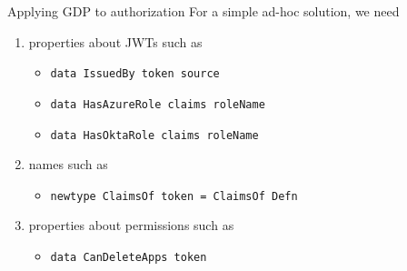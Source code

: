 \documentclass[
  9pt,
  ignorenonframetext,
]{beamer}
\providecommand{\tightlist}{%
  \setlength{\itemsep}{0pt}\setlength{\parskip}{0pt}}
\begin{document}
\begin{frame}[fragile]{Applying GDP to authorization}
\protect\hypertarget{applying-gdp-to-authorization}{}
For a simple ad-hoc solution, we need

\begin{enumerate}
\tightlist
\item
  properties about JWTs such as

  \begin{itemize}
  \tightlist
  \item
    \texttt{data\ IssuedBy\ token\ source}
  \item
    \texttt{data\ HasAzureRole\ claims\ roleName}
  \item
    \texttt{data\ HasOktaRole\ claims\ roleName}
  \end{itemize}
\item
  names such as

  \begin{itemize}
  \tightlist
  \item
    \texttt{newtype\ ClaimsOf\ token\ =\ ClaimsOf\ Defn}
  \end{itemize}
\item
  properties about permissions such as

  \begin{itemize}
  \tightlist
  \item
    \texttt{data\ CanDeleteApps\ token}
  \end{itemize}
\end{enumerate}





\end{frame}
\end{document}
